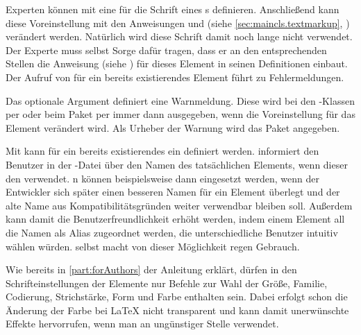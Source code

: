 
\begin{Declaration}
\end{Declaration}
Experten können mit  eine  für die
Schrift eines s definieren. Anschließend kann diese
Voreinstellung mit den Anweisungen  und
 (siehe \autoref{sec:maincls.textmarkup},
) verändert werden. Natürlich wird diese
Schrift damit noch lange nicht verwendet. Der Experte muss selbst Sorge dafür
tragen, dass er an den entsprechenden Stellen die Anweisung
%
 (siehe
) für dieses Element in seinen
Definitionen einbaut. Der Aufruf von  für ein bereits
existierendes Element führt zu Fehlermeldungen.

Das optionale Argument  definiert eine Warnmeldung. Diese wird
bei den \KOMAScript-Klassen per  oder beim Paket
 per  immer dann ausgegeben, wenn die
Voreinstellung für das Element verändert wird. Als Urheber der
Warnung wird das Paket
angegeben.

Mit  kann für ein bereits existierendes 
ein  definiert werden. \KOMAScript{} informiert den Benutzer
in der -Datei über den Namen des tatsächlichen Elements, wenn dieser
den  verwendet. n können
beispielsweise dann eingesetzt werden, wenn der Entwickler sich später einen
besseren Namen für ein Element überlegt und der alte Name aus
Kompatibilitätsgründen weiter verwendbar bleiben soll. Außerdem kann damit die
Benutzerfreundlichkeit erhöht werden, indem einem Element all die Namen als
Alias zugeordnet werden, die unterschiedliche Benutzer intuitiv wählen
würden. \KOMAScript{} selbst macht von dieser Möglichkeit regen Gebrauch.
%
\EndIndexGroup


\begin{Declaration}
\end{Declaration}
Wie bereits in \autoref{part:forAuthors} der Anleitung erklärt, dürfen in den
Schrifteinstellungen der Elemente nur Befehle zur Wahl der Größe, Familie,
Codierung, Strichstärke, Form und Farbe enthalten sein. Dabei erfolgt schon
die Änderung der Farbe bei \LaTeX{} nicht transparent und kann damit
unerwünschte Effekte hervorrufen, wenn man 
an ungünstiger Stelle verwendet.

